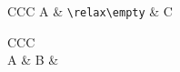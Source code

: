 \documentclass{article}
\begin{document}
  \bfseries

 
\begin{tabular}{CCC}
    A & \relax\verb+\relax\empty+ & C  \\
\end{tabular}%


\begin{tabular}{CCC}
     \\
    A & B &\\
\end{tabular}%
\end{document}

